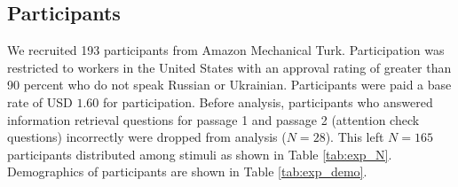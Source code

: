 

\subsection{Participants} 

We recruited 193 participants from Amazon Mechanical Turk. Participation was restricted to workers in the United States with an approval rating of greater than 90 percent who do not speak Russian or Ukrainian. Participants were paid a base rate of USD $1.60$ for participation. Before analysis, participants who answered information retrieval questions for passage 1 and passage 2 (attention check questions) incorrectly were dropped from analysis ($N = 28$).  This left $N = 165$ participants distributed among stimuli as shown in Table \ref{tab:exp_N}. Demographics of participants are shown in Table \ref{tab:exp_demo}.


\begin{table}[h!]
\caption{Participant demographics.}
\label{tab:exp_demo}
\end{table}

